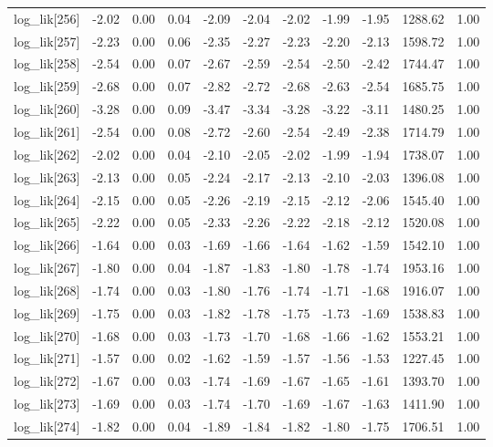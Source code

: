 \begin{table}[ht]
\begin{tabular}{rrrrrrrrrrr}
  log\_lik[256] & -2.02 & 0.00 & 0.04 & -2.09 & -2.04 & -2.02 & -1.99 & -1.95 & 1288.62 & 1.00 \\ 
  log\_lik[257] & -2.23 & 0.00 & 0.06 & -2.35 & -2.27 & -2.23 & -2.20 & -2.13 & 1598.72 & 1.00 \\ 
  log\_lik[258] & -2.54 & 0.00 & 0.07 & -2.67 & -2.59 & -2.54 & -2.50 & -2.42 & 1744.47 & 1.00 \\ 
  log\_lik[259] & -2.68 & 0.00 & 0.07 & -2.82 & -2.72 & -2.68 & -2.63 & -2.54 & 1685.75 & 1.00 \\ 
  log\_lik[260] & -3.28 & 0.00 & 0.09 & -3.47 & -3.34 & -3.28 & -3.22 & -3.11 & 1480.25 & 1.00 \\ 
  log\_lik[261] & -2.54 & 0.00 & 0.08 & -2.72 & -2.60 & -2.54 & -2.49 & -2.38 & 1714.79 & 1.00 \\ 
  log\_lik[262] & -2.02 & 0.00 & 0.04 & -2.10 & -2.05 & -2.02 & -1.99 & -1.94 & 1738.07 & 1.00 \\ 
  log\_lik[263] & -2.13 & 0.00 & 0.05 & -2.24 & -2.17 & -2.13 & -2.10 & -2.03 & 1396.08 & 1.00 \\ 
  log\_lik[264] & -2.15 & 0.00 & 0.05 & -2.26 & -2.19 & -2.15 & -2.12 & -2.06 & 1545.40 & 1.00 \\ 
  log\_lik[265] & -2.22 & 0.00 & 0.05 & -2.33 & -2.26 & -2.22 & -2.18 & -2.12 & 1520.08 & 1.00 \\ 
  log\_lik[266] & -1.64 & 0.00 & 0.03 & -1.69 & -1.66 & -1.64 & -1.62 & -1.59 & 1542.10 & 1.00 \\ 
  log\_lik[267] & -1.80 & 0.00 & 0.04 & -1.87 & -1.83 & -1.80 & -1.78 & -1.74 & 1953.16 & 1.00 \\ 
  log\_lik[268] & -1.74 & 0.00 & 0.03 & -1.80 & -1.76 & -1.74 & -1.71 & -1.68 & 1916.07 & 1.00 \\ 
  log\_lik[269] & -1.75 & 0.00 & 0.03 & -1.82 & -1.78 & -1.75 & -1.73 & -1.69 & 1538.83 & 1.00 \\ 
  log\_lik[270] & -1.68 & 0.00 & 0.03 & -1.73 & -1.70 & -1.68 & -1.66 & -1.62 & 1553.21 & 1.00 \\ 
  log\_lik[271] & -1.57 & 0.00 & 0.02 & -1.62 & -1.59 & -1.57 & -1.56 & -1.53 & 1227.45 & 1.00 \\ 
  log\_lik[272] & -1.67 & 0.00 & 0.03 & -1.74 & -1.69 & -1.67 & -1.65 & -1.61 & 1393.70 & 1.00 \\ 
  log\_lik[273] & -1.69 & 0.00 & 0.03 & -1.74 & -1.70 & -1.69 & -1.67 & -1.63 & 1411.90 & 1.00 \\ 
  log\_lik[274] & -1.82 & 0.00 & 0.04 & -1.89 & -1.84 & -1.82 & -1.80 & -1.75 & 1706.51 & 1.00 \\ 

\end{tabular}
\end{table}
